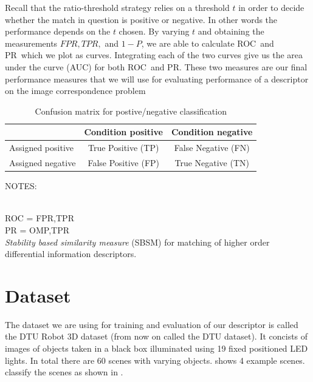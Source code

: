 \documentclass[thesis.tex]{subfiles}
\newcommand\TPR{\mathit{TPR}}
\newcommand\FPR{\mathit{FPR}}
\newcommand\OMP{\mathit{1-P}}
\newcommand\ROC{ROC}
\newcommand\PR{PR}
\begin{document}
Recall that the ratio-threshold strategy relies on a threshold $t$ in order to decide whether the match in question is positive or negative. In other words the performance depends on the $t$ chosen. By varying $t$ and obtaining the measurements $\FPR,\TPR,$ and $\OMP$, we are able to calculate \ROC\ and \PR\ which we plot as curves. Integrating each of the two curves give us the area under the curve (AUC) for both \ROC\ and \PR. These two measures are our final performance measures that we will use for evaluating performance of a descriptor on the image correspondence problem

\begin{table}
	\centering
	\bgroup
	\def\arraystretch{1.5}
	\begin{tabular}{|l|c|c|}
		\cline{2-3}
		\multicolumn{1}{c|}{} & Condition positive & Condition negative \\ \hline
		Assigned positive & \cellcolor{green!25}True Positive (TP) & \cellcolor{red!25}False Negative (FN)  \\ \hline
		Assigned negative & \cellcolor{red!25}False Positive (FP) & \cellcolor{green!25}True Negative (TN) \\ \hline
	\end{tabular}
	\egroup
	\caption{Confusion matrix for postive/negative classification}
	\label{tbl:confusion_matrix}
\end{table}


NOTES:

\citet{dahl2011finding} \\
ROC = FPR,TPR \\
PR = OMP,TPR \\

\emph{Stability based similarity measure} (SBSM) \cite{balmashnova2008novel} for matching of higher order differential information descriptors.

\section{Dataset}
The dataset we are using for training and evaluation of our descriptor is called the DTU Robot 3D dataset \cite{aanaes2010recall} (from now on called the DTU dataset). It concists of images of objects taken in a black box illuminated using 19 fixed positioned LED lights. In total there are 60 scenes with varying objects.  shows 4 example scenes. \citet{aanaes2010ground} classify the scenes as shown in .
\end{document}

